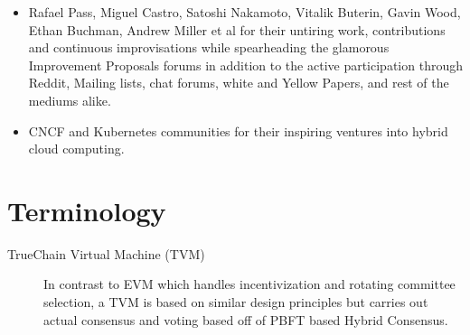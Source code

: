 \documentclass[9pt,oneside]{amsart}
\begin{document}
\begin{multicols}{2}
\begin{itemize}
  \item Rafael Pass, Miguel Castro, Satoshi Nakamoto, Vitalik Buterin, Gavin Wood, Ethan Buchman, Andrew Miller et al
  for their untiring work, contributions and continuous improvisations while spearheading the glamorous Improvement Proposals forums in
  addition to the active participation through Reddit, Mailing lists, chat forums, white and Yellow Papers, and rest of the mediums alike.
  \item CNCF and Kubernetes communities for their inspiring ventures into hybrid cloud computing.
\end{itemize}



\end{multicols}




\appendix

\section{Terminology} \label{ch:Terminology}

\begin{description}
\item[TrueChain Virtual Machine (TVM)] In contrast to EVM which handles incentivization and rotating committee selection,
  a TVM is based on similar design principles but carries out actual consensus and voting based off of PBFT based Hybrid Consensus.
\end{description}

\end{document}
